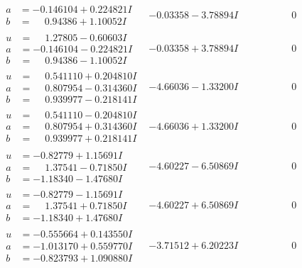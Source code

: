 \documentclass[1p]{elsarticle_modified}
\theoremstyle{definition}
\begin{document}
$$\begin{array}{c|c|c}
\begin{aligned}
a &= -0.146104 + 0.224821 I \\
b &= \phantom{-}0.94386 + 1.10052 I\end{aligned}
 & -0.03358 - 3.78894 I & \phantom{-0.000000 } 0 \\ \hline\begin{aligned}
u &= \phantom{-}1.27805 - 0.60603 I \\
a &= -0.146104 - 0.224821 I \\
b &= \phantom{-}0.94386 - 1.10052 I\end{aligned}
 & -0.03358 + 3.78894 I & \phantom{-0.000000 } 0 \\ \hline\begin{aligned}
u &= \phantom{-}0.541110 + 0.204810 I \\
a &= \phantom{-}0.807954 - 0.314360 I \\
b &= \phantom{-}0.939977 - 0.218141 I\end{aligned}
 & -4.66036 - 1.33200 I & \phantom{-0.000000 } 0 \\ \hline\begin{aligned}
u &= \phantom{-}0.541110 - 0.204810 I \\
a &= \phantom{-}0.807954 + 0.314360 I \\
b &= \phantom{-}0.939977 + 0.218141 I\end{aligned}
 & -4.66036 + 1.33200 I & \phantom{-0.000000 } 0 \\ \hline\begin{aligned}
u &= -0.82779 + 1.15691 I \\
a &= \phantom{-}1.37541 - 0.71850 I \\
b &= -1.18340 - 1.47680 I\end{aligned}
 & -4.60227 - 6.50869 I & \phantom{-0.000000 } 0 \\ \hline\begin{aligned}
u &= -0.82779 - 1.15691 I \\
a &= \phantom{-}1.37541 + 0.71850 I \\
b &= -1.18340 + 1.47680 I\end{aligned}
 & -4.60227 + 6.50869 I & \phantom{-0.000000 } 0 \\ \hline\begin{aligned}
u &= -0.555664 + 0.143550 I \\
a &= -1.013170 + 0.559770 I \\
b &= -0.823793 + 1.090880 I\end{aligned}
 & -3.71512 + 6.20223 I & \phantom{-0.000000 } 0 \\ \hline\begin{aligned}

\end{aligned}
\end{array}$$
\end{document}
